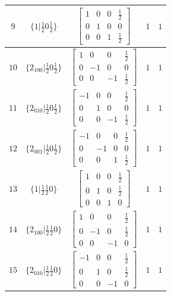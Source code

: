 \documentclass[fleqn,8pt]{jsarticle}
\begin{document}
\begin{longtable}{ccccc}
$ 9 $ & $ \{1|\frac{1}{2} 0 \frac{1}{2}\} $ & $ \begin{bmatrix} 1 & 0 & 0 & \frac{1}{2} \\ 0 & 1 & 0 & 0 \\ 0 & 0 & 1 & \frac{1}{2} \end{bmatrix} $ & $ 1 $ & $ 1 $ \\ \hline
$ 10 $ & $ \{2{}_{100}|\frac{1}{2} 0 \frac{1}{2}\} $ & $ \begin{bmatrix} 1 & 0 & 0 & \frac{1}{2} \\ 0 & -1 & 0 & 0 \\ 0 & 0 & -1 & \frac{1}{2} \end{bmatrix} $ & $ 1 $ & $ 1 $ \\ \hline
$ 11 $ & $ \{2{}_{010}|\frac{1}{2} 0 \frac{1}{2}\} $ & $ \begin{bmatrix} -1 & 0 & 0 & \frac{1}{2} \\ 0 & 1 & 0 & 0 \\ 0 & 0 & -1 & \frac{1}{2} \end{bmatrix} $ & $ 1 $ & $ 1 $ \\ \hline
$ 12 $ & $ \{2{}_{001}|\frac{1}{2} 0 \frac{1}{2}\} $ & $ \begin{bmatrix} -1 & 0 & 0 & \frac{1}{2} \\ 0 & -1 & 0 & 0 \\ 0 & 0 & 1 & \frac{1}{2} \end{bmatrix} $ & $ 1 $ & $ 1 $ \\ \hline
$ 13 $ & $ \{1|\frac{1}{2} \frac{1}{2} 0\} $ & $ \begin{bmatrix} 1 & 0 & 0 & \frac{1}{2} \\ 0 & 1 & 0 & \frac{1}{2} \\ 0 & 0 & 1 & 0 \end{bmatrix} $ & $ 1 $ & $ 1 $ \\ \hline
$ 14 $ & $ \{2{}_{100}|\frac{1}{2} \frac{1}{2} 0\} $ & $ \begin{bmatrix} 1 & 0 & 0 & \frac{1}{2} \\ 0 & -1 & 0 & \frac{1}{2} \\ 0 & 0 & -1 & 0 \end{bmatrix} $ & $ 1 $ & $ 1 $ \\ \hline
$ 15 $ & $ \{2{}_{010}|\frac{1}{2} \frac{1}{2} 0\} $ & $ \begin{bmatrix} -1 & 0 & 0 & \frac{1}{2} \\ 0 & 1 & 0 & \frac{1}{2} \\ 0 & 0 & -1 & 0 \end{bmatrix} $ & $ 1 $ & $ 1 $ \\ \hline

\end{longtable}
\end{document}
